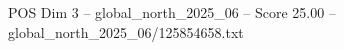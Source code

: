 \begin{textsample}{POS Dim 3 – global\_north\_2025\_06 – Score 25.00 – global\_north\_2025\_06/125854658.txt}
\end{textsample}
